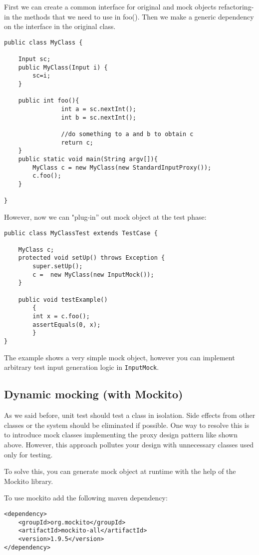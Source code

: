 \documentclass{article}
\begin{document}
First we can create a common interface for original and mock objects
refactoring-in the methods that we need to use in foo().
Then we make a generic dependency on the interface in the original class.

\begin{lstlisting}
public class MyClass {

	Input sc;
	public MyClass(Input i) {
		sc=i;
	}

	public int foo(){
                int a = sc.nextInt();
                int b = sc.nextInt();
		
                //do something to a and b to obtain c
                return c;
	}
	public static void main(String argv[]){
		MyClass c = new MyClass(new StandardInputProxy());
		c.foo();
	}	
	
}
\end{lstlisting}

However, now we can "plug-in'' out mock object at the test phase:

\begin{lstlisting}
public class MyClassTest extends TestCase {

	MyClass c;
	protected void setUp() throws Exception {
		super.setUp();
		c =  new MyClass(new InputMock());
	}
	
	public void testExample()
        {
		int x = c.foo();
		assertEquals(0, x);
        }
}
\end{lstlisting}


The example shows a very simple mock object, however you can implement
arbitrary test input generation logic in \texttt{InputMock}.

\subsection{Dynamic mocking (with Mockito)}

As we said before, unit test should test a class in isolation. Side
effects from other classes or the system should be eliminated if
possible. 
One way to resolve this is to introduce mock classes implementing
the proxy design pattern like shown above. However, this approach
pollutes your design with unnecessary classes used only for testing.

To solve this, you can generate mock object at runtime with the help
of the Mockito library. 

To use mockito add the following maven dependency:

\begin{lstlisting}
<dependency>
	<groupId>org.mockito</groupId>
	<artifactId>mockito-all</artifactId>
	<version>1.9.5</version>
</dependency>
\end{lstlisting}
\end{document}
